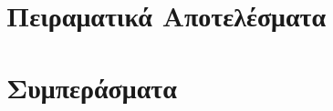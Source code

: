 \documentclass{beamer}
\begin{document}
\begin{frame}
  \frametitle{}
\end{frame}

\begin{frame}
  \frametitle{}
\end{frame}

\begin{frame}
  \frametitle{}
\end{frame}

\begin{frame}
  \frametitle{}
\end{frame}

\section{Πειραματικά Αποτελέσματα}

\begin{frame}
  \frametitle{}
\end{frame}

\begin{frame}
  \frametitle{}
\end{frame}

\begin{frame}
  \frametitle{}
\end{frame}

\section{Συμπεράσματα}

\begin{frame}
  \frametitle{}
\end{frame}

\begin{frame}
  \frametitle{}
\end{frame}

\begin{frame}
  \frametitle{}
\end{frame}
\end{document}
